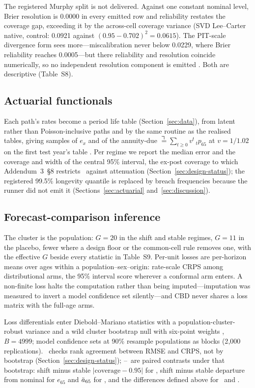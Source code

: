 The registered Murphy split \citep{murphy1973new,pohle2020murphy} is not
delivered. Against one constant nominal level, Brier resolution is 0.0000 in
every emitted row and reliability restates the coverage gap, exceeding it by
the across-cell coverage variance (SVD Lee--Carter native, control: 0.0921
against $(0.95-0.702)^2=0.0615$). The PIT-scale divergence form
\citep{broecker2009reliability} sees more---miscalibration never below 0.0229,
where Brier reliability reaches 0.0005---but there reliability and resolution
coincide numerically, so no independent resolution component is emitted
\citep{hersbach2000decomposition,dimitriadis2021stable}. Both are descriptive
(Table~S8).

\subsection{Actuarial functionals}
\label{sec:metrics-actuarial}

Each path's rates become a period life table (Section~\ref{sec:data}), from
latent rather than Poisson-inclusive paths and by the same routine as the
realised tables, giving samples of $e_x$ and of the annuity-due
$\annuity=\sum_{t\ge0}v^{t}\,{}_t p_{65}$ at $v=1/1.02$ on the first test
year's table \citep{dickson2020actuarial}. Per regime we report the median
error and the coverage and width of the central 95\% interval, the ex-post
coverage to which Addendum~3~\S8 restricts \Hfive\ against attenuation
(Section~\ref{sec:design-status}); the registered 99.5\% longevity quantile is
replaced by breach frequencies because the runner did not emit it
(Sections~\ref{sec:actuarial} and~\ref{sec:discussion}).

\subsection{Forecast-comparison inference}
\label{sec:metrics-inference}

The cluster is the population: $G=20$ in the shift and stable regimes, $G=11$
in the placebo, fewer where a design floor or the common-cell rule removes
one, with the effective $G$ beside every statistic in Table~S9. Per-unit
losses are per-horizon means over ages within a population--sex--origin:
rate-scale CRPS among distributional arms, the 95\% interval score wherever a
conformal arm enters. A non-finite loss halts the computation rather than
being imputed---imputation was measured to invert a model confidence set
silently---and CBD never shares a loss matrix with the full-age arms.

Loss differentials enter Diebold--Mariano statistics
\citep{diebold1995comparing} with a population-cluster-robust variance and a
wild cluster bootstrap null with six-point weights
\citep{cameron2008bootstrap,webb2023reworking,mackinnon2017wild}, $B=4999$;
model confidence sets \citep{hansen2011model} at 90\% resample populations as
blocks (2{,}000 replications). \Hone\ checks rank agreement between RMSE and
CRPS, not by bootstrap (Section~\ref{sec:design-status});
\Htwo--\Hfive\ are paired contrasts under that bootstrap: shift minus stable
$|\text{coverage}-0.95|$ for \Htwo, shift minus stable departure from nominal
for $e_{65}$ and $\ddot{a}_{65}$ for \Hfive, and the differences defined above for
\Hthree\ and \Hfour.
